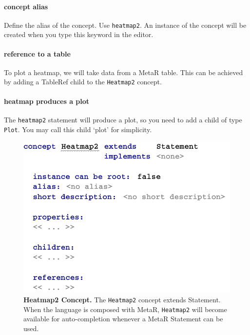 \paragraph{concept alias}
Define the alias of the concept. Use \texttt{heatmap2}. An instance of the concept will be created when you type this keyword in the editor. 

\paragraph{reference to a table}
To plot a heatmap, we will take data from a MetaR table. This can be achieved by adding a TableRef child to the \texttt{Heatmap2} concept.
\paragraph{heatmap produces a plot}
The \texttt{heatmap2} statement will produce a plot, so you need to add a child of type \texttt{Plot}. You may call this child `plot' for simplicity.

\begin{figure}[htbp]
  \centering
  \includegraphics[width=\figWidthNarrow]{figures/Heatmap2Concept.pdf}
\caption[Heatmap2 Concept.]{\textbf{Heatmap2 Concept.} The \texttt{Heatmap2} concept extends Statement. When the language is composed with MetaR, \texttt{Heatmap2} will become available for auto-completion whenever a MetaR Statement can be used.}
\label{fig:Heatmap2Concept}
\end{figure}

